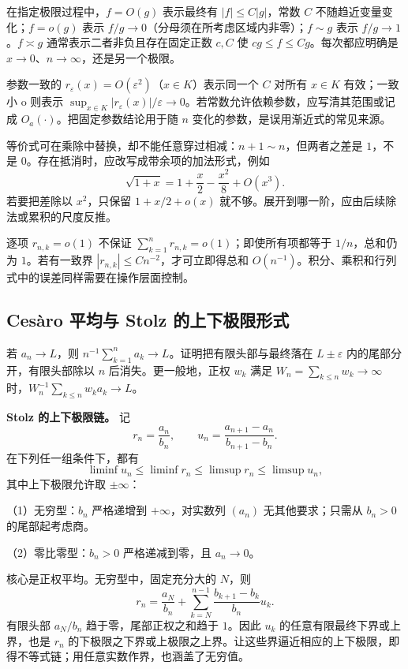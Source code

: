 \documentclass[12pt,fontset=fandol]{ctexart}
\begin{document}
\label{app:limit-notation}

在指定极限过程中，$f=O(g)$ 表示最终有 $|f|\leq C|g|$，常数 $C$ 不随趋近变量变化；$f=o(g)$ 表示 $f/g\to0$（分母须在所考虑区域内非零）；$f\sim g$ 表示 $f/g\to1$。$f\asymp g$ 通常表示二者非负且存在固定正数 $c,C$ 使 $cg\leq f\leq Cg$。每次都应明确是 $x\to0$、$n\to\infty$，还是另一个极限。

参数一致的 $r_\varepsilon(x)=O(\varepsilon^2)$（$x\in K$）表示同一个 $C$ 对所有 $x\in K$ 有效；一致小 o 则表示 $\sup_{x\in K}|r_\varepsilon(x)|/\varepsilon\to0$。若常数允许依赖参数，应写清其范围或记成 $O_a(\cdot)$。把固定参数结论用于随 $n$ 变化的参数，是误用渐近式的常见来源。

等价式可在乘除中替换，却不能任意穿过相减：$n+1\sim n$，但两者之差是 $1$，不是 $0$。存在抵消时，应改写成带余项的加法形式，例如
\[
\sqrt{1+x}=1+\frac x2-\frac{x^2}{8}+O(x^3).
\]
若要把差除以 $x^2$，只保留 $1+x/2+o(x)$ 就不够。展开到哪一阶，应由后续除法或累积的尺度反推。

逐项 $r_{n,k}=o(1)$ 不保证 $\sum_{k=1}^nr_{n,k}=o(1)$；即使所有项都等于 $1/n$，总和仍为 $1$。若有一致界 $|r_{n,k}|\leq Cn^{-2}$，才可立即得总和 $O(n^{-1})$。积分、乘积和行列式中的误差同样需要在操作层面控制。

\subsection{Cesàro 平均与 Stolz 的上下极限形式}

\label{app:limit-stolz}

若 $a_n\to L$，则 $n^{-1}\sum_{k=1}^na_k\to L$。证明把有限头部与最终落在 $L\pm\varepsilon$ 内的尾部分开，有限头部除以 $n$ 后消失。更一般地，正权 $w_k$ 满足 $W_n=\sum_{k\leq n}w_k\to\infty$ 时，$W_n^{-1}\sum_{k\leq n}w_ka_k\to L$。

\textbf{Stolz 的上下极限链。} 记
\[
r_n=\frac{a_n}{b_n},\qquad
u_n=\frac{a_{n+1}-a_n}{b_{n+1}-b_n}.
\]
在下列任一组条件下，都有
\[
\liminf u_n\leq\liminf r_n
\leq\limsup r_n\leq\limsup u_n,
\]
其中上下极限允许取 $\pm\infty$：

（1）无穷型：$b_n$ 严格递增到 $+\infty$，对实数列 $(a_n)$ 无其他要求；只需从 $b_n>0$ 的尾部起考虑商。

（2）零比零型：$b_n>0$ 严格递减到零，且 $a_n\to0$。

核心是正权平均。无穷型中，固定充分大的 $N$，则
\[
r_n=\frac{a_N}{b_n}
+\sum_{k=N}^{n-1}\frac{b_{k+1}-b_k}{b_n}u_k.
\]
有限头部 $a_N/b_n$ 趋于零，尾部正权之和趋于 $1$。因此 $u_k$ 的任意有限最终下界或上界，也是 $r_n$ 的下极限之下界或上极限之上界。让这些界逼近相应的上下极限，即得不等式链；用任意实数作界，也涵盖了无穷值。
\end{document}
